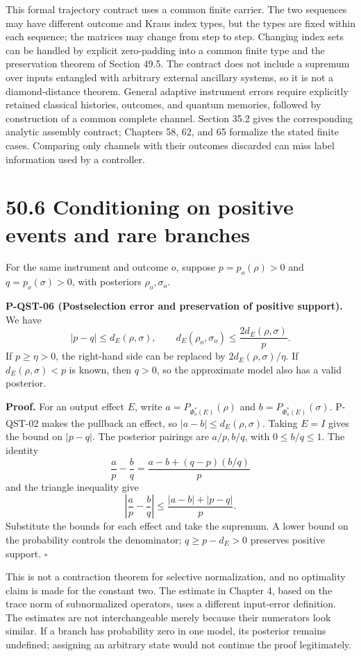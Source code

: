 \documentclass[
  11pt,
  oneside]{book}
\begin{document}
This formal trajectory contract uses a common finite carrier. The two
sequences may have different outcome and Kraus index types, but the
types are fixed within each sequence; the matrices may change from step
to step. Changing index sets can be handled by explicit zero-padding
into a common finite type and the preservation theorem of Section 49.5.
The contract does not include a supremum over inputs entangled with
arbitrary external ancillary systems, so it is not a diamond-distance
theorem. General adaptive instrument errors require explicitly retained
classical histories, outcomes, and quantum memories, followed by
construction of a common complete channel. Section 35.2 gives the
corresponding analytic assembly contract; Chapters 58, 62, and 65
formalize the stated finite cases. Comparing only channels with their
outcomes discarded can miss label information used by a controller.

\section{50.6 Conditioning on positive events and rare branches}

For the same instrument and outcome \(o\), suppose \(p=p_o(\rho)>0\) and
\(q=p_o(\sigma)>0\), with posteriors \(\rho_o,\sigma_o\).

\label{p-qst-06}{}

\textbf{P-QST-06 (Postselection error and preservation of positive
support).} We have \[
|p-q|\le d_E(\rho,\sigma),\qquad
d_E(\rho_o,\sigma_o)\le \frac{2d_E(\rho,\sigma)}{p}.
\] If \(p\ge\eta>0\), the right-hand side can be replaced by
\(2d_E(\rho,\sigma)/\eta\). If \(d_E(\rho,\sigma)<p\) is known, then
\(q>0\), so the approximate model also has a valid posterior.

\textbf{Proof.} For an output effect \(E\), write
\(a=P_{\Phi_o^*(E)}(\rho)\) and \(b=P_{\Phi_o^*(E)}(\sigma)\). P-QST-02
makes the pullback an effect, so \(|a-b|\le d_E(\rho,\sigma)\). Taking
\(E=I\) gives the bound on \(|p-q|\). The posterior pairings are
\(a/p,b/q\), with \(0\le b/q\le1\). The identity \[
\frac ap-\frac bq=
\frac{a-b+(q-p)(b/q)}p
\] and the triangle inequality give \[
\left|\frac ap-\frac bq\right|
\le\frac{|a-b|+|p-q|}{p}.
\] Substitute the bounds for each effect and take the supremum. A lower
bound on the probability controls the denominator; \(q\ge p-d_E>0\)
preserves positive support. \(\square\)

This is not a contraction theorem for selective normalization, and no
optimality claim is made for the constant two. The estimate in Chapter
4, based on the trace norm of subnormalized operators, uses a different
input-error definition. The estimates are not interchangeable merely
because their numerators look similar. If a branch has probability zero
in one model, its posterior remains undefined; assigning an arbitrary
state would not continue the proof legitimately.
\end{document}
